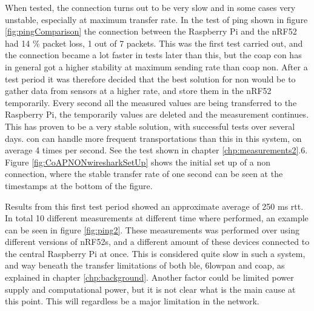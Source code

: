 \noindent When tested, the connection turns out to be very slow and in some cases very unstable, especially at maximum transfer rate. In the test of ping shown in figure \ref{fig:pingComparison} the connection between the Raspberry Pi and the nRF52 had 14 \% packet loss, 1 out of 7 packets. This was the first test carried out, and the connection became a lot faster in tests later than this, but the \gls{coap} \gls{con} has in general got a  higher stability at maximum sending rate than \gls{coap} \gls{non}. After a test period it was therefore decided that the best solution for \gls{non} would be to gather data from sensors at a higher rate, and store them in the nRF52 temporarily. Every second all the measured values are being transferred to the Raspberry Pi, the temporarily values are deleted and the measurement continues. This has proven to be a very stable solution, with successful tests over several days. \gls{con} can handle more frequent transportations than this in this system, on average 4 times per second. See the test shown in chapter \ref{chp:measurements2}.6. Figure  \ref{fig:CoAPNONwiresharkSetUp} shows the initial set up of a \gls{non} connection, where the stable transfer rate of one second can be seen at the timestamps at the bottom of the figure. 




\noindent Results from this first test period showed an approximate average of 250 ms \gls{rtt}. In total 10 different measurements at different time where performed, an example can be seen in figure \ref{fig:ping2}. These measurements was performed over using different versions of \glspl{nRF52}, and a different amount of these devices connected to the central Raspberry Pi at once. This is considered quite slow in such a system, and way beneath the transfer limitations of both \gls{ble}, \gls{6lowpan} and \gls{coap}, as explained in chapter \ref{chp:background}. Another factor could be limited power supply and computational power, but it is not clear what is the main cause at this point. This will regardless be a major limitation in the network. 

